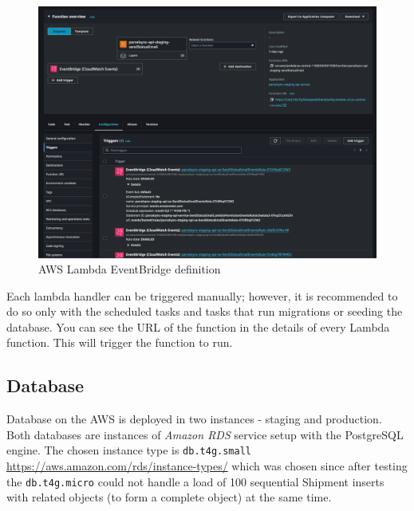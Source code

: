 \begin{figure}[H]\centering
\includegraphics[width=140mm]{img/docs/fig_aws_eventbridge.png}
\caption{AWS Lambda EventBridge definition}
\label{img:admin-manual-aws.lambda.eventbridge}
\end{figure}

Each lambda handler can be triggered manually; however, it is recommended to do so only with the scheduled tasks and tasks that run migrations or seeding the database.
You can see the URL of the function in the details of every Lambda function.
This will trigger the function to run.


\subsection{Database}
Database on the AWS is deployed in two instances - staging and production.
Both databases are instances of \textit{Amazon RDS} service setup with the PostgreSQL engine.
The chosen instance type is \texttt{db.t4g.small} \url{https://aws.amazon.com/rds/instance-types/} which was chosen since after testing the \texttt{db.t4g.micro} could not handle a load of 100 sequential Shipment inserts with related objects (to form a complete object) at the same time.

